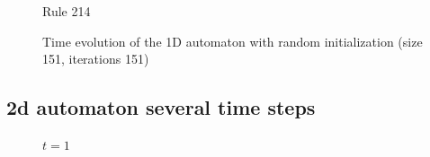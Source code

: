 \documentclass[12pt,a4paper]{article}
\begin{document}
\begin{figure}[H]
\begin{minipage}[b]{0.45\textwidth}
        \caption*{\small Rule 214}
    \end{minipage}
    \caption{\small Time evolution of the 1D automaton with random initialization (size 151, iterations 151)}
    \label{fig:time_evolution_square}
\end{figure}


\newpage

\subsection*{\small 2d automaton several time steps}

\begin{figure}[H]
    \centering
    \begin{minipage}[b]{0.25\textwidth}
        \centering
        \caption*{\small $t=1$}
    \end{minipage}
    \hspace{0.1cm}
    \begin{minipage}[b]{0.25\textwidth}
        \centering

\end{minipage}
\end{figure}
\end{document}
